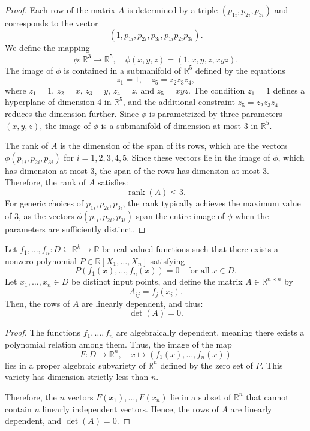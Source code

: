 \documentclass[
	11pt, %
	fleqn, %
	a4paper, %
]{LegrandOrangeBook}
\DeclareMathOperator{\rank}{rank}
\begin{document}
\begin{proof}
Each row of the matrix $A$ is determined by a triple $(p_{1i}, p_{2i}, p_{3i})$ and corresponds to the vector
\[
(1, p_{1i}, p_{2i}, p_{3i}, p_{1i} p_{2i} p_{3i}).
\]
We define the mapping
\[
\phi: \mathbb{R}^3 \to \mathbb{R}^5, \quad \phi(x, y, z) = (1, x, y, z, xyz).
\]
The image of $\phi$ is contained in a submanifold of $\mathbb{R}^5$ defined by the equations
\[
z_1 = 1, \quad z_5 = z_2 z_3 z_4,
\]
where $z_1 = 1$, $z_2 = x$, $z_3 = y$, $z_4 = z$, and $z_5 = xyz$. The condition $z_1 = 1$ defines a hyperplane of dimension 4 in $\mathbb{R}^5$, and the additional constraint $z_5 = z_2 z_3 z_4$ reduces the dimension further. Since $\phi$ is parametrized by three parameters $(x, y, z)$, the image of $\phi$ is a submanifold of dimension at most 3 in $\mathbb{R}^5$.

The rank of $A$ is the dimension of the span of its rows, which are the vectors $\phi(p_{1i}, p_{2i}, p_{3i})$ for $i = 1, 2, 3, 4, 5$. Since these vectors lie in the image of $\phi$, which has dimension at most 3, the span of the rows has dimension at most 3. Therefore, the rank of $A$ satisfies:
\[
\rank(A) \leq 3.
\]
For generic choices of $p_{1i}, p_{2i}, p_{3i}$, the rank typically achieves the maximum value of 3, as the vectors $\phi(p_{1i}, p_{2i}, p_{3i})$ span the entire image of $\phi$ when the parameters are sufficiently distinct.
\end{proof}
\begin{theorem}
Let $f_1, \dots, f_n : D \subseteq \mathbb{R}^k \to \mathbb{R}$ be real-valued functions such that there exists a nonzero polynomial $P \in \mathbb{R}[X_1, \dots, X_n]$ satisfying
\[
P(f_1(x), \dots, f_n(x)) = 0 \quad \text{for all } x \in D.
\]
Let $x_1, \dots, x_n \in D$ be distinct input points, and define the matrix $A \in \mathbb{R}^{n \times n}$ by
\[
A_{ij} = f_j(x_i).
\]
Then, the rows of $A$ are linearly dependent, and thus:
\[
\det(A) = 0.
\]
\end{theorem}

\begin{proof}
The functions $f_1, \dots, f_n$ are algebraically dependent, meaning there exists a polynomial relation among them. Thus, the image of the map
\[
F : D \to \mathbb{R}^n, \quad x \mapsto (f_1(x), \dots, f_n(x))
\]
lies in a proper algebraic subvariety of $\mathbb{R}^n$ defined by the zero set of $P$. This variety has dimension strictly less than $n$.

Therefore, the $n$ vectors $F(x_1), \dots, F(x_n)$ lie in a subset of $\mathbb{R}^n$ that cannot contain $n$ linearly independent vectors. Hence, the rows of $A$ are linearly dependent, and $\det(A) = 0$.
\end{proof}
\end{document}

